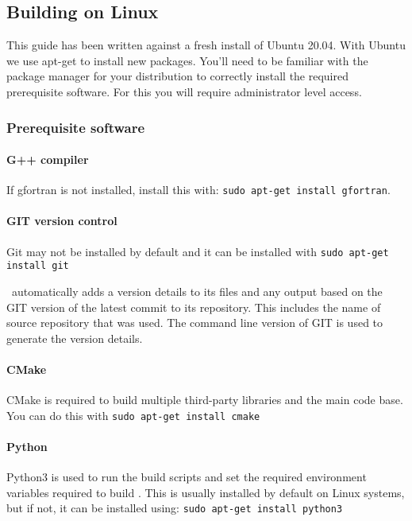 \subsection{Building on Linux}

This guide has been written against a fresh install of Ubuntu 20.04. With Ubuntu we use apt-get to install new packages. You’ll need to be familiar with the package manager for your distribution to correctly install the required prerequisite software. For this you will require administrator level access.

\subsubsection{Prerequisite software}

\paragraph*{G++ compiler}

If gfortran is not installed, install this with: \texttt{sudo apt-get install gfortran}.

\paragraph*{GIT version control}

Git may not be installed by default and it can be installed with \texttt{sudo apt-get install git}

\CNAME\ automatically adds a version details to its files and any output based on the GIT version of the latest commit to its repository. This includes the name of source repository that was used. The command line version of GIT is used  to generate the version details.

\paragraph*{CMake}

CMake is required to build multiple third-party libraries and the main code base. You can do this with \texttt{sudo apt-get install cmake}

\paragraph*{Python}

Python3 is used to run the build scripts and set the required environment variables required to build \CNAME. This is usually installed by default on Linux systems, but if not, it can be installed using: \texttt{sudo apt-get install python3}

